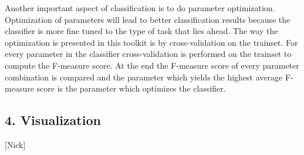 Another important aspect of classification is to do parameter optimization. 
Optimization of parameters will lead to better classification results because the classifier is more fine tuned to the type of task that lies ahead. 
The way the optimization is presented in this toolkit is by cross-validation on the trainset. 
For every parameter in the classifier cross-validation is performed on the trainset to compute the F-measure score. 
At the end the F-measure score of every parameter combination is compared and the parameter which yields the highest average F-measure score is the parameter which optimizes the classifier.

\subsection{4. Visualization}
[Nick]
